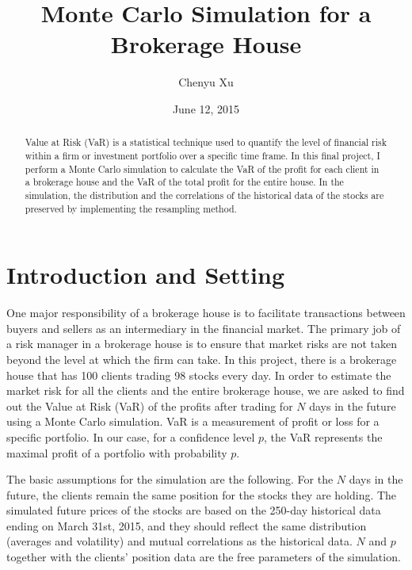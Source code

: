\documentclass[letterpaper,11pt]{article}
\begin{document}
\title{\textbf{Monte Carlo Simulation for a Brokerage House}} %
\author{Chenyu Xu} %
\date{\small June 12, 2015}

\maketitle
 
\begin{abstract}
Value at Risk (VaR) is a statistical technique used to quantify the level of financial risk within a firm or investment portfolio over a specific time frame.
In this final project, I perform a Monte Carlo simulation to calculate the VaR of the profit for each client in a brokerage house and the VaR of the total profit for the entire house.
In the simulation, the distribution and the correlations of the historical data of the stocks are preserved by implementing the resampling method.
\end{abstract}

\doublespacing

\section{Introduction and Setting}
One major responsibility of a brokerage house is to facilitate transactions between buyers and sellers as an intermediary in the financial market.
The primary job of a risk manager in a brokerage house is to ensure that market risks are not taken beyond the level at which the firm can take.
In this project, there is a brokerage house that has 100 clients trading 98 stocks every day. 
In order to estimate the market risk for all the clients and the entire brokerage house, we are asked to find out the Value at Risk (VaR) of the profits after trading for $N$ days in the future using a Monte Carlo simulation.
VaR is a measurement of profit or loss for a specific portfolio.
In our case, for a confidence level $p$, the VaR represents the maximal profit of a portfolio with probability $p$.

The basic assumptions for the simulation are the following.
For the $N$ days in the future, the clients remain the same position for the stocks they are holding.
The simulated future prices of the stocks are based on the 250-day historical data ending on March 31st, 2015, and they should reflect the same distribution (averages and volatility) and mutual correlations as the historical data.
$N$ and $p$ together with the clients' position data are the free parameters of the simulation.
\end{document}
